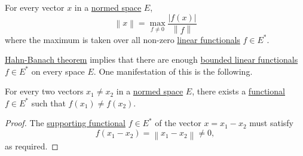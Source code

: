 \begin{corollary}
	For every vector \(x\) in a \hyperref[def:normed-vector-space]{normed space} \(E\),
	\[
		\left\lVert x\right\rVert = \max _{f \neq 0}\frac{\left\vert f(x) \right\vert }{\left\lVert f\right\rVert }
	\]
	where the maximum is taken over all non-zero \hyperref[def:linear-functional]{linear functionals} \(f\in E^{\ast} \).
\end{corollary}

\hyperref[thm:Hahn-Banach]{Hahn-Banach theorem} implies that there are enough \hyperref[def:bounded-linear-functional]{bounded linear functionals} \(f\in E^{\ast} \) on every space \(E\). One manifestation of this is the following.
\begin{corollary}
	For every two vectors \(x_1 \neq x_2\) in a \hyperref[def:normed-vector-space]{normed space} \(E\), there exists a \hyperref[def:linear-functional]{functional} \(f\in E^{\ast} \) such that \(f(x_1) \neq f(x_2)\).
\end{corollary}
\begin{proof}
	The \hyperref[thm:supporting-functional]{supporting functional} \(f\in E^{\ast} \) of the vector \(x = x_1 - x_2\) must satisfy
	\[
		f(x_1 - x_2)= \left\lVert x_1 - x_2\right\rVert \neq 0,
	\]
	as required.
\end{proof}

